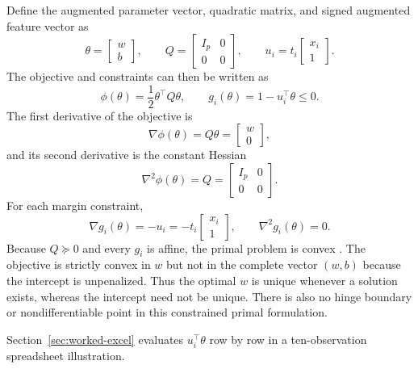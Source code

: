 \documentclass[11pt,a4paper]{article}
\numberwithin{equation}{section} %
\begin{document}
Define the augmented parameter vector, quadratic matrix, and signed augmented feature vector as
\begin{equation}
    \theta=\begin{bmatrix}w\\b\end{bmatrix},\qquad
    Q=\begin{bmatrix}I_p&0\\0&0\end{bmatrix},\qquad
    u_i=t_i\begin{bmatrix}x_i\\1\end{bmatrix}.
\end{equation}
The objective and constraints can then be written as
\begin{equation}
    \phi(\theta)=\frac{1}{2}\theta^\top Q\theta,
    \qquad
    g_i(\theta)=1-u_i^\top\theta\leq0.
\end{equation}
The first derivative of the objective is
\begin{equation}
    \nabla\phi(\theta)=Q\theta
    =\begin{bmatrix}w\\0\end{bmatrix},
\end{equation}
and its second derivative is the constant Hessian
\begin{equation}
    \nabla^2\phi(\theta)=Q
    =\begin{bmatrix}I_p&0\\0&0\end{bmatrix}.
\end{equation}
For each margin constraint,
\begin{equation}
    \nabla g_i(\theta)=-u_i
    =-t_i\begin{bmatrix}x_i\\1\end{bmatrix},
    \qquad
    \nabla^2 g_i(\theta)=0.
\end{equation}
Because $Q\succeq0$ and every $g_i$ is affine, the primal problem is convex \cite{lec-convex}. The objective is strictly convex in $w$ but not in the complete vector $(w,b)$ because the intercept is unpenalized. Thus the optimal $w$ is unique whenever a solution exists, whereas the intercept need not be unique. There is also no hinge boundary or nondifferentiable point in this constrained primal formulation.

Section~\ref{sec:worked-excel} evaluates $u_i^\top\theta$ row by row in a ten-observation spreadsheet illustration.
\end{document}
